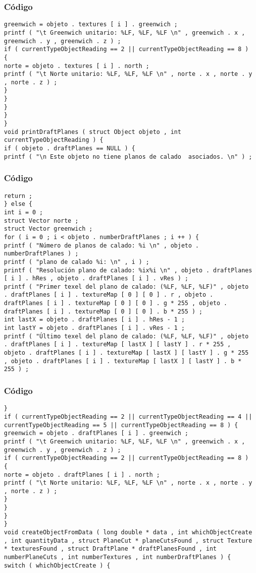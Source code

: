 \documentclass{beamer}
\begin{document}
\begin{frame}[fragile]
\frametitle{C\'odigo}
\begin{verbatim}
greenwich = objeto . textures [ i ] . greenwich ; 
printf ( "\t Greenwich unitario: %LF, %LF, %LF \n" , greenwich . x , greenwich . y , greenwich . z ) ; 
if ( currentTypeObjectReading == 2 || currentTypeObjectReading == 8 ) { 
norte = objeto . textures [ i ] . north ; 
printf ( "\t Norte unitario: %LF, %LF, %LF \n" , norte . x , norte . y , norte . z ) ; 
} 
} 
} 
} 
} 
void printDraftPlanes ( struct Object objeto , int currentTypeObjectReading ) { 
if ( objeto . draftPlanes == NULL ) { 
printf ( "\n Este objeto no tiene planos de calado  asociados. \n" ) ; 
\end{verbatim}
\end{frame}
\begin{frame}[fragile]
\frametitle{C\'odigo}
\begin{verbatim}
return ; 
} else { 
int i = 0 ; 
struct Vector norte ; 
struct Vector greenwich ; 
for ( i = 0 ; i < objeto . numberDraftPlanes ; i ++ ) { 
printf ( "Número de planos de calado: %i \n" , objeto . numberDraftPlanes ) ; 
printf ( "plano de calado %i: \n" , i ) ; 
printf ( "Resolución plano de calado: %ix%i \n" , objeto . draftPlanes [ i ] . hRes , objeto . draftPlanes [ i ] . vRes ) ; 
printf ( "Primer texel del plano de calado: (%LF, %LF, %LF)" , objeto . draftPlanes [ i ] . textureMap [ 0 ] [ 0 ] . r , objeto . draftPlanes [ i ] . textureMap [ 0 ] [ 0 ] . g * 255 , objeto . draftPlanes [ i ] . textureMap [ 0 ] [ 0 ] . b * 255 ) ; 
int lastX = objeto . draftPlanes [ i ] . hRes - 1 ; 
int lastY = objeto . draftPlanes [ i ] . vRes - 1 ; 
printf ( "Último texel del plano de calado: (%LF, %LF, %LF)" , objeto . draftPlanes [ i ] . textureMap [ lastX ] [ lastY ] . r * 255 , objeto . draftPlanes [ i ] . textureMap [ lastX ] [ lastY ] . g * 255 , objeto . draftPlanes [ i ] . textureMap [ lastX ] [ lastY ] . b * 255 ) ; 
\end{verbatim}
\end{frame}
\begin{frame}[fragile]
\frametitle{C\'odigo}
\begin{verbatim}
} 
if ( currentTypeObjectReading == 2 || currentTypeObjectReading == 4 || currentTypeObjectReading == 5 || currentTypeObjectReading == 8 ) { 
greenwich = objeto . draftPlanes [ i ] . greenwich ; 
printf ( "\t Greenwich unitario: %LF, %LF, %LF \n" , greenwich . x , greenwich . y , greenwich . z ) ; 
if ( currentTypeObjectReading == 2 || currentTypeObjectReading == 8 ) { 
norte = objeto . draftPlanes [ i ] . north ; 
printf ( "\t Norte unitario: %LF, %LF, %LF \n" , norte . x , norte . y , norte . z ) ; 
} 
} 
} 
} 
void createObjectFromData ( long double * data , int whichObjectCreate , int quantityData , struct PlaneCut * planeCutsFound , struct Texture * texturesFound , struct DraftPlane * draftPlanesFound , int numberPlaneCuts , int numberTextures , int numberDraftPlanes ) { 
switch ( whichObjectCreate ) { 
\end{verbatim}
\end{frame}
\end{document}
